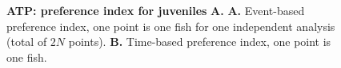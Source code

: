 \begin{appendices}
\begin{figure}[h]
      \caption{\textbf{ATP: preference index for juveniles} \textbf{A.} \textbf{A.} Event-based preference index, one point is one fish for one independent analysis (total of $2N$ points). \textbf{B.} Time-based preference index, one point is one fish.  }
      \label{dist_atp}
    \end{figure}

\end{appendices}
